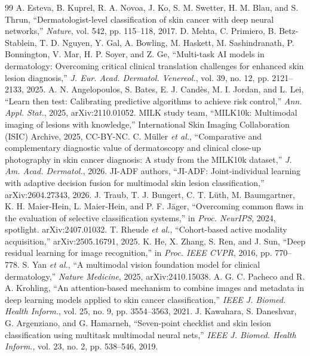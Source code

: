 \documentclass[conference]{IEEEtran}
\begin{document}
\begin{thebibliography}{99}
 A. Esteva, B. Kuprel, R. A. Novoa, J. Ko, S. M. Swetter, H. M. Blau, and S. Thrun, ``Dermatologist-level classification of skin cancer with deep neural networks,'' \textit{Nature}, vol. 542, pp. 115--118, 2017.
 D. Mehta, C. Primiero, B. Betz-Stablein, T. D. Nguyen, Y. Gal, A. Bowling, M. Haskett, M. Sashindranath, P. Bonnington, V. Mar, H. P. Soyer, and Z. Ge, ``Multi-task AI models in dermatology: Overcoming critical clinical translation challenges for enhanced skin lesion diagnosis,'' \textit{J. Eur. Acad. Dermatol. Venereol.}, vol. 39, no. 12, pp. 2121--2133, 2025.
 A. N. Angelopoulos, S. Bates, E. J. Cand\`es, M. I. Jordan, and L. Lei, ``Learn then test: Calibrating predictive algorithms to achieve risk control,'' \textit{Ann. Appl. Stat.}, 2025, arXiv:2110.01052.
 MILK study team, ``MILK10k: Multimodal imaging of lesions with knowledge,'' International Skin Imaging Collaboration (ISIC) Archive, 2025, CC-BY-NC.
 C. M\"uller \textit{et al.}, ``Comparative and complementary diagnostic value of dermatoscopy and clinical close-up photography in skin cancer diagnosis: A study from the MILK10k dataset,'' \textit{J. Am. Acad. Dermatol.}, 2026.
 JI-ADF authors, ``JI-ADF: Joint-individual learning with adaptive decision fusion for multimodal skin lesion classification,'' arXiv:2604.27343, 2026.
 J. Traub, T. J. Bungert, C. T. L\"uth, M. Baumgartner, K. H. Maier-Hein, L. Maier-Hein, and P. F. J\"ager, ``Overcoming common flaws in the evaluation of selective classification systems,'' in \textit{Proc. NeurIPS}, 2024, spotlight. arXiv:2407.01032.
 T. Rheude \textit{et al.}, ``Cohort-based active modality acquisition,'' arXiv:2505.16791, 2025.
 K. He, X. Zhang, S. Ren, and J. Sun, ``Deep residual learning for image recognition,'' in \textit{Proc. IEEE CVPR}, 2016, pp. 770--778.
 S. Yan \textit{et al.}, ``A multimodal vision foundation model for clinical dermatology,'' \textit{Nature Medicine}, 2025, arXiv:2410.15038.
 A. G. C. Pacheco and R. A. Krohling, ``An attention-based mechanism to combine images and metadata in deep learning models applied to skin cancer classification,'' \textit{IEEE J. Biomed. Health Inform.}, vol. 25, no. 9, pp. 3554--3563, 2021.
 J. Kawahara, S. Daneshvar, G. Argenziano, and G. Hamarneh, ``Seven-point checklist and skin lesion classification using multitask multimodal neural nets,'' \textit{IEEE J. Biomed. Health Inform.}, vol. 23, no. 2, pp. 538--546, 2019.

\end{thebibliography}
\end{document}
